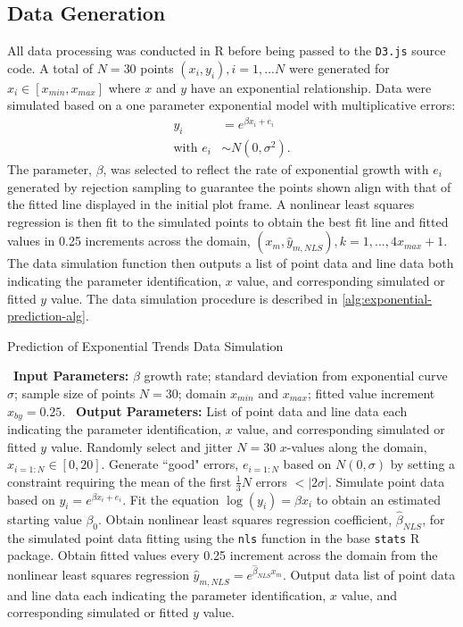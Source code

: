 \documentclass[print]{nuthesis}
\begin{document}
\hypertarget{data-generation-2}{%
\subsection{Data Generation}\label{data-generation-2}}

All data processing was conducted in R before being passed to the \texttt{D3.js} source code.
A total of \(N = 30\) points \((x_i, y_i), i = 1,...N\) were generated for \(x_i\in [x_{min}, x_{max}]\) where \(x\) and \(y\) have an exponential relationship.
Data were simulated based on a one parameter exponential model with multiplicative errors:
\begin{align}
y_i & = e^{\beta x_i + e_i} \\
\text{with } e_i & \sim N(0, \sigma^2). \nonumber
\end{align}
The parameter, \(\beta\), was selected to reflect the rate of exponential growth with \(e_i\) generated by rejection sampling to guarantee the points shown align with that of the fitted line displayed in the initial plot frame.
A nonlinear least squares regression is then fit to the simulated points to obtain the best fit line and fitted values in 0.25 increments across the domain, \((x_m, \hat y_{m,NLS}), k = 1, ..., 4 x_{max} +1\).
The data simulation function then outputs a list of point data and line data both indicating the parameter identification, \(x\) value, and corresponding simulated or fitted \(y\) value.
The data simulation procedure is described in \cref{alg:exponential-prediction-alg}.

\begin{algorithm}
  \caption{Prediction of Exponential Trends Data Simulation}\label{alg:exponential-prediction-alg}
  \begin{algorithmic}[1]
    \Statex \textbullet~\textbf{Input Parameters:} $\beta$ growth rate; standard deviation from exponential curve $\sigma$; sample size of points $N = 30$; domain $x_{min}$ and $x_{max}$; fitted value increment $x_{by} = 0.25$.
    \Statex \textbullet~\textbf{Output Parameters:} List of point data and line data each indicating the parameter identification, $x$ value, and corresponding simulated or fitted $y$ value.
    \State Randomly select and jitter $N = 30$ $x$-values along the domain, $x_{i=1:N}\in [0, 20]$.
    \State Generate ``good" errors, $e_{i = 1:N}$ based on $N(0,\sigma)$ by setting a constraint requiring the mean of the first $\frac{1}{3} N$ errors $< |2\sigma|.$
    \State Simulate point data based on $y_i = e^{\beta x_i + e_i}$.
    \State Fit the equation $\log(y_i) = \beta x_i$ to obtain an estimated starting value $\beta_0$. 
    \State Obtain nonlinear least squares regression coefficient, $\hat\beta_{NLS}$, for the simulated point data fitting using the \texttt{nls} function in the base \texttt{stats} R package.
    \State Obtain fitted values every 0.25 increment across the domain from the nonlinear least squares regression $\hat y_{m,NLS} = e^{\hat\beta_{NLS} x_m}$.
    \State Output data list of point data and line data each indicating the parameter identification, $x$ value, and corresponding simulated or fitted $y$ value.
  \end{algorithmic}
\end{algorithm}
\end{document}
